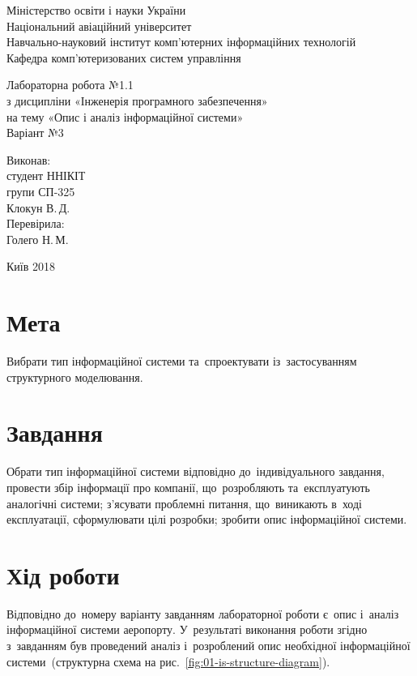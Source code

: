 \documentclass[
	a4paper,
	oneside,
	DIV = 12,
	12pt,
	headings = normal,
]{scrartcl}
\begin{document}
	\begin{titlepage}
		\begin{center}
			Міністерство освіти і науки України\\
			Національний авіаційний університет\\
			Навчально-науковий інститут комп'ютерних інформаційних технологій\\
			Кафедра комп'ютеризованих систем управління

			\vspace{\fill}
				Лабораторна робота №1.1\\
				з дисципліни «Інженерія програмного забезпечення»\\
				на тему «Опис і аналіз інформаційної системи»\\
				Варіант №3

			\vspace{\fill}

			\begin{flushright}
				Виконав:\\
				студент ННІКІТ\\
				групи СП-325\\
				Клокун В.\,Д.\\
				Перевірила:\\
				Голего Н.\,М.
			\end{flushright}

			Київ 2018
		\end{center}
	\end{titlepage}

	\section{Мета}
		Вибрати тип інформаційної системи та~спроектувати із~застосуванням структурного моделювання.

	\section{Завдання}
		Обрати тип інформаційної системи відповідно до~індивідуального завдання, провести збір інформації про компанії, що~розробляють та~експлуатують аналогічні системи; з'ясувати проблемні питання, що~виникають в~ході експлуатації, сформулювати цілі розробки; зробити опис інформаційної системи.
		
	\section{Хід роботи}
		Відповідно до~номеру варіанту завданням лабораторної роботи є~опис і~аналіз інформаційної системи аеропорту. У~результаті виконання роботи згідно з~завданням був проведений аналіз і~розроблений опис необхідної інформаційної системи~(структурна схема на рис.~\ref{fig:01-is-structure-diagram}).
\end{document}
